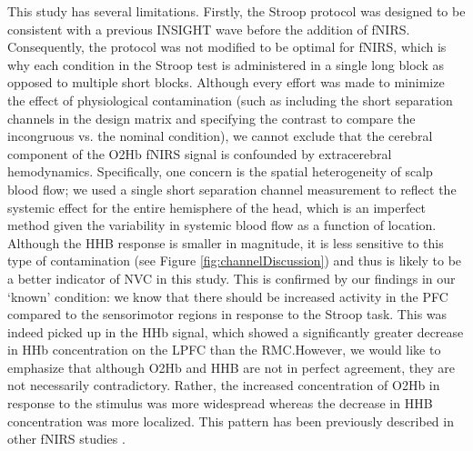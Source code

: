 \documentclass[12pt]{spieman}  %
\begin{document}
\begin{spacing}{2}
This study has several limitations. Firstly, the Stroop protocol was designed to be consistent with a previous INSIGHT wave before the addition of fNIRS. Consequently, the protocol was not modified to be optimal for fNIRS, which is why each condition in the Stroop test is administered in a single long block as opposed to multiple short blocks. Although every effort was made to minimize the effect of physiological contamination (such as including the short separation channels in the design matrix and specifying the contrast to compare the incongruous vs. the nominal condition), we cannot exclude that the cerebral component of the O2Hb fNIRS signal is confounded by extracerebral hemodynamics. Specifically, one concern is the spatial heterogeneity of scalp blood flow; we used a single short separation channel measurement to reflect the systemic effect for the entire hemisphere of the head, which is an imperfect method given the variability in systemic blood flow as a function of location. Although the HHB response is smaller in magnitude, it is less sensitive to this type of contamination (see Figure \ref{fig:channelDiscussion}) and thus is likely to be a better indicator of NVC in this study\cite{Tachtsidis2016}. This is confirmed by our findings in our `known' condition: we know that there should be increased activity in the PFC compared to the sensorimotor regions in response to the Stroop task. This was indeed picked up in the HHb signal, which showed a significantly greater decrease in HHb concentration on the LPFC than the RMC.However, we would like to emphasize that although O2Hb and HHB are not in perfect agreement, they are not necessarily contradictory. Rather, the increased concentration of O2Hb in response to the stimulus was more widespread whereas the decrease in HHB concentration was more localized. This pattern has been previously described in other fNIRS studies \cite{Pinti2021}.


\end{spacing}
\end{document}
